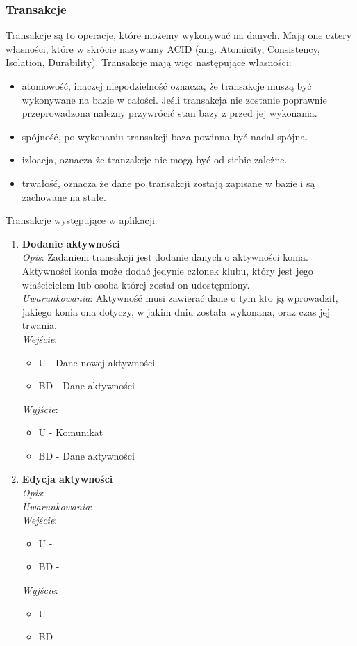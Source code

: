 \documentclass[12pt,twoside]{report}
\begin{document}
\subsubsection{Transakcje}
Transakcje są to operacje, które możemy wykonywać na danych. Mają one cztery własności, które w skrócie nazywamy ACID (ang. Atomicity, Consistency, Isolation, Durability). Transakcje mają więc następujące własności:
\begin{itemize}
	\item atomowość, inaczej niepodzielność oznacza, że transakcje muszą być wykonywane na bazie w całości. Jeśli transakcja nie zostanie poprawnie przeprowadzona należny przywrócić stan bazy z przed jej wykonania.
	\item spójność, po wykonaniu transakcji baza powinna być nadal spójna.
	\item izloacja, oznacza że tranzakcje nie mogą być od siebie zależne.
	\item trwałość, oznacza że dane po transakcji zostają zapisane w bazie i są zachowane na stałe.
\end{itemize}	
Transakcje występujące w aplikacji:
\begin{enumerate}[start=1,label={\bfseries TRA\textbackslash00\arabic*}]
	
	\item \textbf{Dodanie aktywności }\\
	\textit{Opis}: Zadaniem transakcji jest dodanie danych o aktywności konia. Aktywności konia może dodać jedynie członek klubu, który jest jego właścicielem lub osoba której został on udostępniony.\\
	\textit{Uwarunkowania}: Aktywność musi zawierać dane o tym kto ją wprowadził, jakiego konia ona dotyczy, w jakim dniu została wykonana, oraz czas jej trwania.\\
	\textit{Wejście}:
		\begin{itemize}
			\item U - Dane nowej aktywności
			\item BD - Dane aktywności
		\end{itemize} 
	\textit{Wyjście}:
		\begin{itemize}
			\item U - Komunikat
			\item BD - Dane aktywności
		\end{itemize} 
	
	\item \textbf{Edycja aktywności }\\
	\textit{Opis}: \\
	\textit{Uwarunkowania}: \\
	\textit{Wejście}:
	\begin{itemize}
		\item U - 
		\item BD -
	\end{itemize} 
	\textit{Wyjście}:
	\begin{itemize}
		\item U - 
		\item BD -
	\end{itemize} 
\end{enumerate}
\newpage
\renewcommand{\arraystretch}{1.5}
\end{document}
